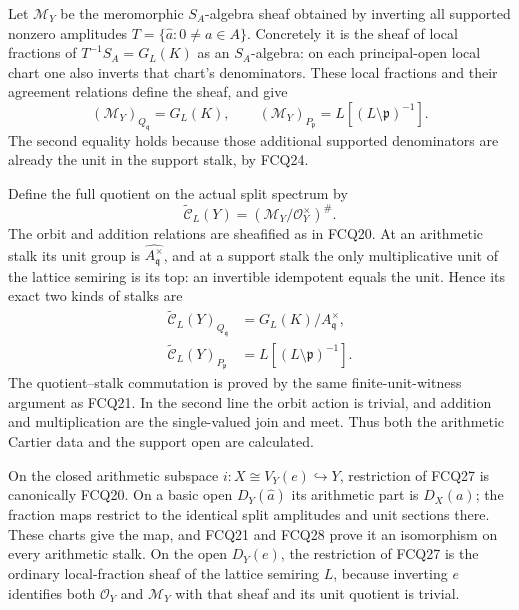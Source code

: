 Let $\mathcal M_Y$ be the meromorphic $S_A$-algebra sheaf
obtained by inverting all supported nonzero amplitudes
$T=\{\widehat a:0\ne a\in A\}$. Concretely it is the
sheaf of local fractions of $T^{-1}S_A=G_L(K)$ as an
$S_A$-algebra: on each principal-open local chart one
also inverts that chart's denominators. These local
fractions and their agreement relations define the
sheaf, and give
\begin{equation}\tag{FCQ26}
(\mathcal M_Y)_{Q_{\mathfrak q}}=G_L(K),\qquad
(\mathcal M_Y)_{P_{\mathfrak p}}
       =L[(L\setminus\mathfrak p)^{-1}].
\end{equation}
The second equality holds because those additional
supported denominators are already the unit in the
support stalk, by FCQ24.

Define the full quotient on the actual split spectrum by
\begin{equation}\tag{FCQ27}
\widetilde{\mathscr C}_L(Y)
       =(\mathcal M_Y/\mathcal O_Y^\times)^\# .
\end{equation}
The orbit and addition relations are sheafified as in
FCQ20. At an arithmetic stalk its unit group is
$\widehat{A_{\mathfrak q}^\times}$, and at a support
stalk the only multiplicative unit of the lattice
semiring is its top: an invertible idempotent equals
the unit. Hence its exact two kinds of stalks are
\begin{equation}\tag{FCQ28}
\begin{aligned}
\widetilde{\mathscr C}_L(Y)_{Q_{\mathfrak q}}
   &=G_L(K)/A_{\mathfrak q}^\times,\\
\widetilde{\mathscr C}_L(Y)_{P_{\mathfrak p}}
   &=L[(L\setminus\mathfrak p)^{-1}].
\end{aligned}
\end{equation}
The quotient--stalk commutation is proved by the same
finite-unit-witness argument as FCQ21. In the second
line the orbit action is trivial, and addition and
multiplication are the single-valued join and meet.
Thus both the arithmetic Cartier data and the support
open are calculated.

On the closed arithmetic subspace
$i:X\cong V_Y(e)\hookrightarrow Y$, restriction of
FCQ27 is canonically FCQ20. On a basic open
$D_Y(\widehat a)$ its arithmetic part is $D_X(a)$;
the fraction maps restrict to the identical split
amplitudes and unit sections there. These charts
give the map, and FCQ21 and FCQ28 prove it an
isomorphism on every arithmetic stalk. On the open
$D_Y(e)$, the restriction of FCQ27 is the ordinary
local-fraction sheaf of the lattice semiring $L$,
because inverting $e$ identifies both
$\mathcal O_Y$ and $\mathcal M_Y$ with that sheaf
and its unit quotient is trivial.

